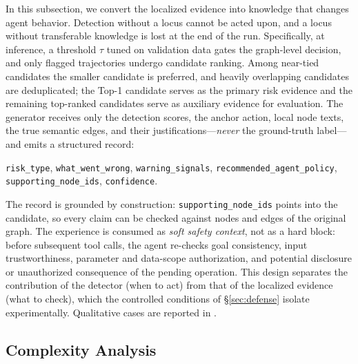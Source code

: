 In this subsection, we convert the localized evidence into knowledge that changes agent behavior. Detection without a locus cannot be acted upon, and a locus without transferable knowledge is lost at the end of the run. Specifically, at inference, a threshold $\tau$ tuned on validation data gates the graph-level decision, and only flagged trajectories undergo candidate ranking. Among near-tied candidates the smaller candidate is preferred, and heavily overlapping candidates are deduplicated; the Top-1 candidate serves as the primary risk evidence and the remaining top-ranked candidates serve as auxiliary evidence for evaluation. The \sexp{} generator receives only the detection scores, the anchor action, local node texts, the true semantic edges, and their justifications---\emph{never} the ground-truth label---and emits a structured record:
\begin{center}
\small
\texttt{risk\_type}, \texttt{what\_went\_wrong}, \texttt{warning\_signals}, \texttt{recommended\_agent\_policy}, \texttt{supporting\_node\_ids}, \texttt{confidence}.
\end{center}
The record is grounded by construction: \texttt{supporting\_node\_ids} points into the candidate, so every claim can be checked against nodes and edges of the original graph. The experience is consumed as \emph{soft safety context}, not as a hard block: before subsequent tool calls, the agent re-checks goal consistency, input trustworthiness, parameter and data-scope authorization, and potential disclosure or unauthorized consequence of the pending operation. This design separates the contribution of the detector (when to act) from that of the localized evidence (what to check), which the controlled conditions of \S\ref{sec:defense} isolate experimentally. Qualitative cases are reported in .

\subsection{Complexity Analysis}

